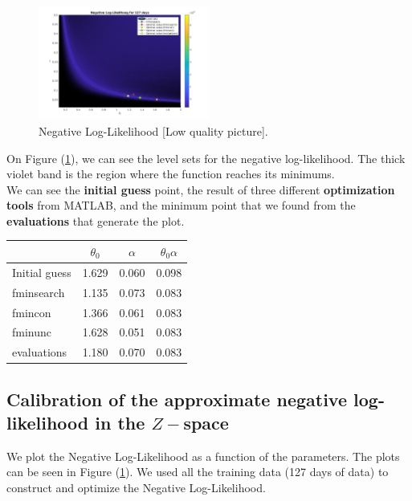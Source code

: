 \documentclass[11pt]{article}
\theoremstyle{definition}
\begin{document}
\begin{figure}[H]
\centering
\includegraphics[width=0.5\textwidth]{../../MATLAB_Files/Results/likelihood/normal/Log-Likelihood.jpg}
\caption{Negative Log-Likelihood {\color{red}[Low quality picture]}.}
\label{fig:neg-LL}
\end{figure}
On Figure (\ref{fig:neg-LL}), we can see the level sets for the negative log-likelihood. The thick violet band is the region where the function reaches its minimums.\\
We can see the \textbf{initial guess} point, the result of three different \textbf{optimization tools} from MATLAB, and the minimum point that we found from the \textbf{evaluations} that generate the plot.
\begin{table}[]
\centering
\begin{tabular}{lccc}
\toprule
 & $\theta_0$ & $\alpha$ & $\theta_0\alpha$\\
 \midrule
 Initial guess & 1.629 & 0.060 & 0.098 \\
 fminsearch & 1.135 & 0.073 & 0.083 \\
 fmincon & 1.366 & 0.061 & 0.083 \\
 fminunc & 1.628 & 0.051 & 0.083 \\
 evaluations & 1.180 & 0.070 & 0.083 \\
 \bottomrule
\end{tabular}
\end{table}

\subsection{Calibration of the approximate negative log-likelihood in the $Z-$space}

We plot the Negative Log-Likelihood as a function of the parameters. The plots can be seen in Figure (\ref{fig:neg-LL}). We used all the training data (127 days of data) to construct and optimize the Negative Log-Likelihood.
\end{document}
